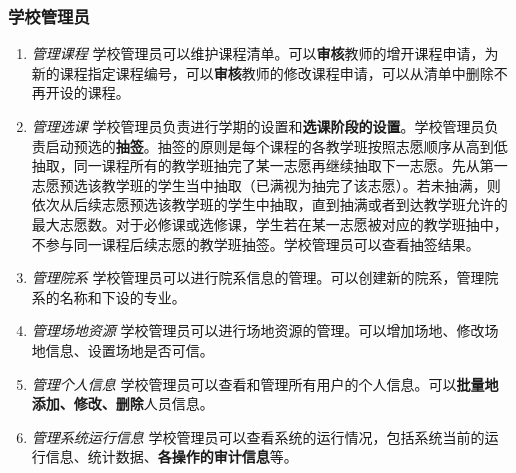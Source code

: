 \subsubsection{学校管理员}
\begin{enumerate}
    \item \textit{管理课程} \quad 学校管理员可以维护课程清单。可以\textbf{审核}教师的增开课程申请，为新的课程指定课程编号，可以\textbf{审核}教师的修改课程申请，可以从清单中删除不再开设的课程。
    \item \textit{管理选课} \quad 学校管理员负责进行学期的设置和\textbf{选课阶段的设置}。学校管理员负责启动预选的\textbf{抽签}。抽签的原则是每个课程的各教学班按照志愿顺序从高到低抽取，同一课程所有的教学班抽完了某一志愿再继续抽取下一志愿。先从第一志愿预选该教学班的学生当中抽取（已满视为抽完了该志愿）。若未抽满，则依次从后续志愿预选该教学班的学生中抽取，直到抽满或者到达教学班允许的最大志愿数。对于必修课或选修课，学生若在某一志愿被对应的教学班抽中，不参与同一课程后续志愿的教学班抽签。学校管理员可以查看抽签结果。
    \item \textit{管理院系} \quad 学校管理员可以进行院系信息的管理。可以创建新的院系，管理院系的名称和下设的专业。
    \item \textit{管理场地资源} \quad 学校管理员可以进行场地资源的管理。可以增加场地、修改场地信息、设置场地是否可信。
    \item \textit{管理个人信息} \quad 学校管理员可以查看和管理所有用户的个人信息。可以\textbf{批量地添加、修改、删除}人员信息。
    \item \textit{管理系统运行信息} \quad 学校管理员可以查看系统的运行情况，包括系统当前的运行信息、统计数据、\textbf{各操作的审计信息}等。
\end{enumerate}
